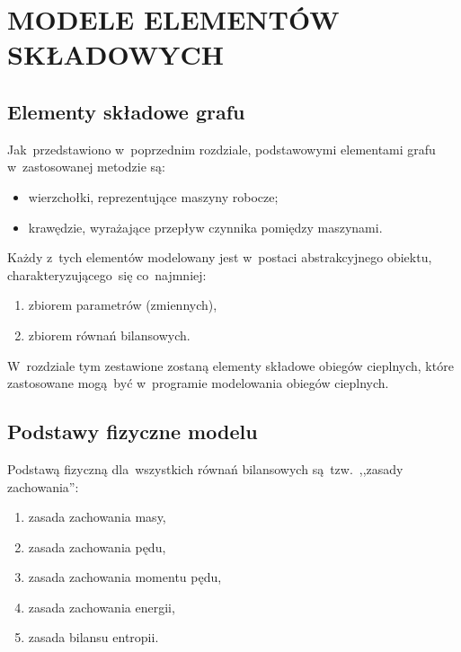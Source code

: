 \section{MODELE ELEMENTÓW SKŁADOWYCH}

\subsection{Elementy składowe grafu}

Jak~przedstawiono w~poprzednim rozdziale, podstawowymi elementami grafu
w~zastosowanej metodzie są:

\begin{itemize}

	\item wierzchołki, reprezentujące maszyny robocze;

	\item krawędzie, wyrażające przepływ czynnika pomiędzy maszynami.

\end{itemize}

Każdy z~tych elementów modelowany jest w~postaci abstrakcyjnego obiektu,
charakteryzującego~się co~najmniej:

\begin{enumerate}

	\item zbiorem parametrów (zmiennych),

	\item zbiorem równań bilansowych.

\end{enumerate}

W~rozdziale tym zestawione zostaną elementy składowe obiegów cieplnych,
które zastosowane mogą~być w~programie modelowania obiegów cieplnych.


\subsection{Podstawy fizyczne modelu}

Podstawą fizyczną dla~wszystkich równań bilansowych są~tzw.~,,zasady
zachowania'':

\begin{enumerate}

	\item zasada zachowania masy,

	\item zasada zachowania pędu,

	\item zasada zachowania momentu pędu,

	\item zasada zachowania energii,

	\item zasada bilansu entropii.

\end{enumerate}

